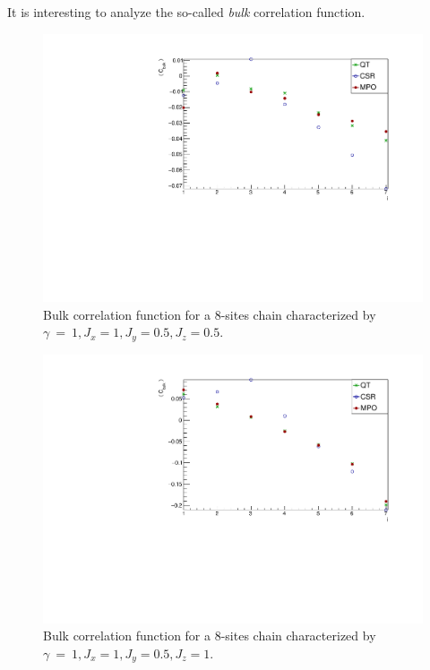 It is interesting to analyze the so-called \emph{bulk} correlation function. 

\begin{figure}[H]
    \centering
    \includegraphics[scale=0.7]{Figures/8sites_comparison/CorrFuncBulk_8sJ10505.pdf}
    \caption{Bulk correlation function for a 8-sites chain characterized by $\gamma~=~1, J_x=1, J_y=0.5, J_z=0.5$.}
    \label{fig:my_label}
\end{figure}

\begin{figure}[H]
    \centering
    \includegraphics[scale=0.7]{Figures/8sites_comparison/CorrFuncBulk_8sJ1051.pdf}
    \caption{Bulk correlation function for a 8-sites chain characterized by $\gamma~=~1, J_x=1, J_y=0.5, J_z=1$.}
    \label{fig:my_label}
\end{figure}

